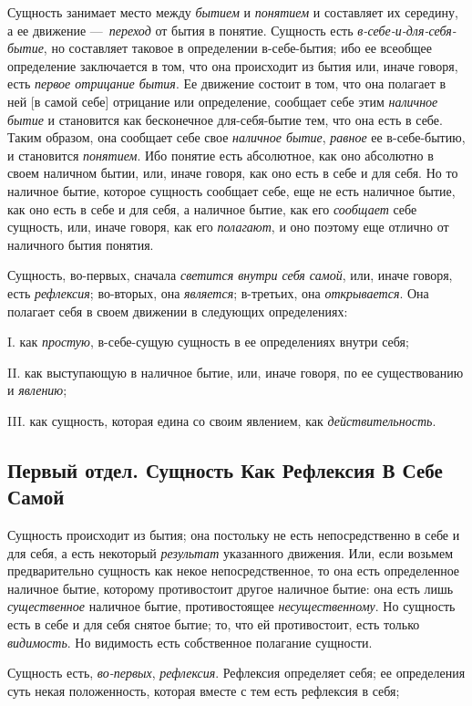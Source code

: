 Сущность занимает место между {\em бытием} и
{\em понятием} и составляет их середину, а ее движение
—~{\em переход} от бытия в понятие. Сущность есть
{\em в-себе-и-для-себя-бытие}, но составляет таковое в
определении в-себе-бытия; ибо ее всеобщее определение заключается в том,
что она происходит из бытия или, иначе говоря, есть
{\em первое отрицание бытия}. Ее движение состоит в
том, что она полагает в ней [в самой себе] отрицание или определение,
сообщает себе этим {\em наличное бытие} и становится
как бесконечное для-себя-бытие тем, что она есть в себе. Таким образом, она
сообщает себе свое {\em наличное бытие},
{\em равное} ее в-себе-бытию, и становится
{\em понятием}. Ибо понятие есть абсолютное, как оно
абсолютно в своем наличном бытии, или, иначе говоря, как оно есть в себе и
для себя. Но то наличное бытие, которое сущность сообщает себе, еще не есть
наличное бытие, как оно есть в себе и для себя, а наличное бытие, как его
{\em сообщает} себе сущность, или, иначе говоря, как
его {\em полагают}, и оно поэтому еще отлично от
наличного бытия понятия.

Сущность, во-первых, сначала {\em светится внутри себя
самой}, или, иначе говоря, есть {\em рефлексия};
во-вторых, она {\em является}; в-третьих, она
{\em открывается}. Она полагает себя в своем движении в
следующих определениях:

I. как {\em простую}, в-себе-сущую сущность в ее
определениях внутри себя;

II. как выступающую в наличное бытие, или, иначе говоря, по ее существованию
и {\em явлению};

III. как сущность, которая едина со своим явлением, как
{\em действительность}.

\clearpage\subsection{Первый отдел. Сущность Как Рефлексия В Себе Самой}
Сущность происходит из бытия; она постольку не
есть непосредственно в себе и для себя, а есть некоторый
{\em результат} указанного движения. Или, если возьмем
предварительно сущность как некое непосредственное, то она есть
определенное наличное бытие, которому противостоит другое наличное бытие:
она есть лишь {\em существенное} наличное бытие,
противостоящее {\em несущественному}. Но сущность есть
в себе и для себя снятое бытие; то, что ей противостоит, есть только
{\em видимость}. Но видимость есть собственное
полагание сущности.

Сущность есть, {\em во-первых},
{\em рефлексия}. Рефлексия определяет себя; ее
определения суть некая положенность, которая вместе с тем есть рефлексия в
себя;

